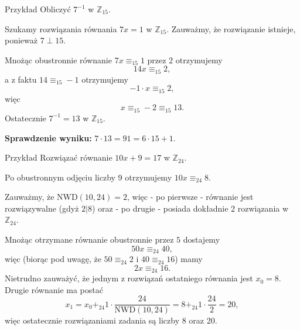 \documentclass[a4paper,10pt]{beamer}
\begin{document}
\begin{frame}
	
	\begin{exampleblock}{Przykład}
		Obliczyć $7^{-1}$ w $\mathbb{Z}_{15}$.
		
		Szukamy rozwiązania równania $7x=1$ w $\mathbb{Z}_{15}$. Zauważmy, że rozwiązanie istnieje, ponieważ $7\perp15$.
		
		Mnożąc obustronnie równanie $7x\equiv_{15}1$ przez 2 otrzymujemy
		$$14x\equiv_{15}2,$$
		a z faktu $14\equiv_{15}-1$ otrzymujemy
		$$-1\cdot x\equiv_{15}2,$$
		więc
		$$x\equiv_{15}-2\equiv_{15}13.$$
		Ostatecznie $7^{-1}=13$ w $\mathbb{Z}_{15}$.
		
		{\bf Sprawdzenie wyniku:} $7\cdot13=91=6\cdot15+1$.
	\end{exampleblock}


\end{frame}

\begin{frame}
	
	\begin{exampleblock}{Przykład}
		Rozwiązać równanie $10x+9=17$ w $\mathbb{Z}_{24}$.

		Po obustronnym odjęciu liczby 9 otrzymujemy $10x\equiv_{24}8.$
		
		Zauważmy, że $\mbox{NWD}(10,24)=2$, więc - po pierwsze - równanie jest rozwiązywalne (gdyż $2|8$) oraz - po drugie - posiada dokładnie 2 rozwiązania w $\mathbb{Z}_{24}$.
		
		Mnożąc otrzymane równanie obustronnie przez $5$ dostajemy $$50x\equiv_{24}40,$$ więc (biorąc pod uwagę, że $50\equiv_{24}2$ i $40\equiv_{24}16$) mamy $$2x\equiv_{24} 16.$$
		Nietrudno zauważyć, że jednym z rozwiązań ostatniego równania jest $x_0=8$. Drugie równanie ma postać $$x_1=x_0+_{24}1\cdot\frac{24}{\mbox{NWD}(10,24)}=8+_{24}1\cdot\frac{24}2=20,$$
		więc ostatecznie rozwiązaniami zadania są liczby 8 oraz 20.
	\end{exampleblock}
	
\end{frame}
\end{document}

